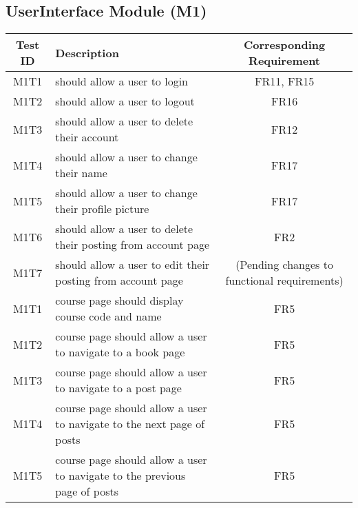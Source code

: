 \documentclass[fullpage]{article}
\begin{document}
\subsection{UserInterface Module (M1)}
\begin{table}[H]
\flushleft
\begin{tabular}{|c|p{8.5cm}|c|}
\hline
 \rowcolor{lightgray} 
\textbf{Test ID} &\textbf{Description} &\textbf{Corresponding Requirement}\\
\hline
M1T1 & should allow a user to login & FR11, FR15 \\
\hline
M1T2 & should allow a user to logout & FR16 \\
\hline
M1T3 & should allow a user to delete their account & FR12 \\
\hline
M1T4 & should allow a user to change their name & FR17 \\
\hline
M1T5 & should allow a user to change their profile picture & FR17 \\
\hline
M1T6 & should allow a user to delete their posting from account page & FR2 \\
\hline
M1T7 & should allow a user to edit their posting from account page & (Pending changes to functional requirements) \\
\hline
M1T1 & course page should display course code and name & FR5 \\
\hline
M1T2 & course page should allow a user to navigate to a book page & FR5 \\
\hline
M1T3 & course page should allow a user to navigate to a post page & FR5 \\
\hline
M1T4 & course page should allow a user to navigate to the next page of posts & FR5 \\
\hline
M1T5 & course page should allow a user to navigate to the previous page of posts & FR5 \\
\hline
\end{tabular}
\end{table}
\end{document}
